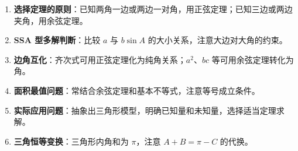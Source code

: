\documentclass[11pt]{ctexrep}
\begin{document}
\begin{enumerate}
    \item \textbf{选择定理的原则}：已知两角一边或两边一对角，用正弦定理；已知三边或两边夹角，用余弦定理。
    \item \textbf{SSA 型多解判断}：比较 $a$ 与 $b\sin A$ 的大小关系，注意大边对大角的约束。
    \item \textbf{边角互化}：齐次式可用正弦定理化为纯角关系；$a^2$、$bc$ 等可用余弦定理转化为角。
    \item \textbf{面积最值问题}：常结合余弦定理和基本不等式，注意等号成立条件。
    \item \textbf{实际应用问题}：抽象出三角形模型，明确已知量和未知量，选择适当定理求解。
    \item \textbf{三角恒等变换}：三角形内角和为 $\pi$，注意 $A + B = \pi - C$ 的代换。
\end{enumerate}
\end{document}

